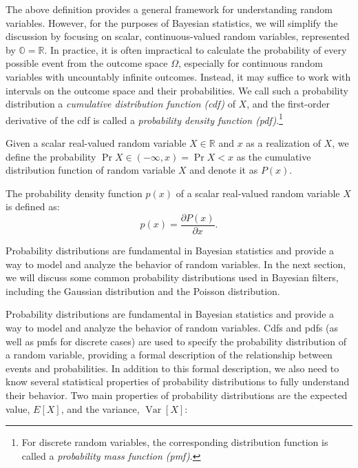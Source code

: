 The above definition provides a general framework for understanding random variables.
However, for the purposes of Bayesian statistics, we will simplify the discussion by
focusing on scalar, continuous-valued random variables, represented
by $\mathbb{O} = \mathbb{R}$. In practice, it is often impractical to calculate the
probability of every possible event from the outcome space $\Omega$, especially for
continuous random variables with uncountably infinite outcomes. Instead, it may suffice
to work with intervals on the outcome space and their probabilities. We call such a
probability distribution a \textit{cumulative distribution function (cdf)} of $X$,
and the first-order derivative of the cdf is called a \textit{probability density
function (pdf)}.\footnote{
    For discrete random variables, the corresponding distribution function is
    called a \textit{probability mass function (pmf)}.
}

\begin{definition}
    Given a scalar real-valued random variable $X \in \mathbb{R}$ and $x$ as a
    realization of $X$, we define the probability $\Pr{X \in (-\infty, x)} = \Pr{X < x}$
    as the cumulative distribution function of random variable $X$ and denote it as $P(x)$.
\end{definition}

\begin{definition}
    The probability density function $p(x)$ of a scalar real-valued random variable $X$
    is defined as:
    $$
    p(x) = \frac{\partial P(x)}{\partial x}.
    $$
\end{definition}

Probability distributions are fundamental in Bayesian statistics and provide a way
to model and analyze the behavior of random variables. In the next section,
we will discuss some common probability distributions used in Bayesian filters,
including the Gaussian distribution and the Poisson distribution.

Probability distributions are fundamental in Bayesian statistics and provide a way
to model and analyze the behavior of random variables. Cdfs and pdfs (as well as pmfs
for discrete cases) are used to specify the probability distribution of a random
variable, providing a formal description of the relationship
between events and probabilities. In addition to this formal description, we also
need to know several statistical properties of probability distributions to fully
understand their behavior. Two main properties of probability distributions are
the expected value, $E[X]$, and the variance, $\operatorname{Var}[X]$:

